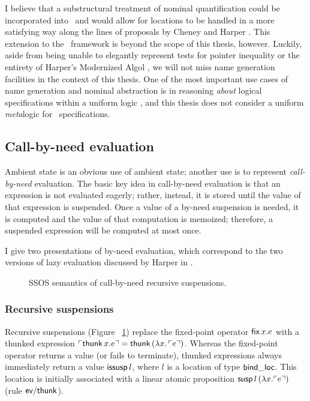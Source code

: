 I believe that a substructural treatment of nominal quantification
could be incorporated into \sls~and would allow for locations to be
handled in a more satisfying way along the lines of proposals by
Cheney and Harper \cite{cheney12dependent,harper12practical}. This
extension to the \sls~framework is beyond the scope of this thesis,
however. Luckily, aside from being unable to elegantly represent tests
for pointer inequality or the entirety of Harper's Modernized Algol
\cite[Chapter 35]{harper12practical}, we will not miss name generation
facilities in the context of this thesis. One of the most important
use cases of name generation and nominal abstraction is in reasoning
{\it about} logical specifications within a uniform logic
\cite{gacek11nominal}, and this thesis does not consider a uniform {\it
  meta}logic for \sls~specifications.

\subsection{Call-by-need evaluation}
\label{sec:call-by-need}

Ambient state is an obvious use of ambient state; another use is to
represent {\it call-by-need} evaluation. The basic key idea in
call-by-need evaluation is that an expression is not evaluated
eagerly; rather, instead, it is stored until the value of that
expression is suspended. Once a value of a by-need suspension is
needed, it is computed and the value of that computation is memoized;
therefore, a suspended expression will be computed at most once.

I give two presentations of by-need evaluation, which correspond to
the two versions of lazy evaluation discussed by Harper in
\cite[Chapter 37]{harper12practical}.



\begin{figure}[t]
\caption{SSOS semantics of call-by-need recursive suspensions.}
\label{fig:ssos-cbneed}
\end{figure}

\subsubsection{Recursive suspensions}


Recursive suspensions (Figure ~\ref{fig:ssos-cbneed}) replace the
fixed-point operator ${\sf fix}\,x.e$ with a thunked expression
${\ulcorner{{\sf thunk}\,x.e}\urcorner} = {\sf thunk}\,(\lambda
x.\,{\ulcorner{e}\urcorner})$. Whereas the fixed-point operator returns a value (or
fails to terminate), thunked expressions always immediately return a
value ${\sf issusp}\,l$, where $l$ is a location of type ${\sf
  bind\_loc}$. This location is initially associated with a linear
atomic proposition ${\sf susp}\,l\,(\lambda x.{\ulcorner{e}\urcorner})$ (rule ${\sf
  ev/thunk}$).

